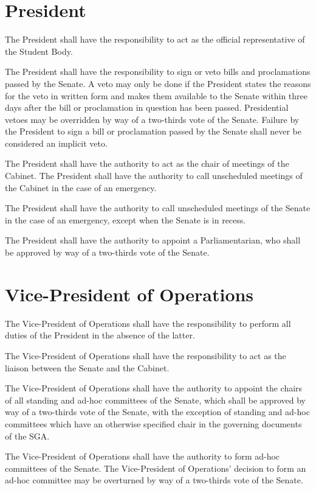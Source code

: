 \documentclass[12pt,oneside]{scrreprt}
\begin{document}
\section{President}
The President shall have the responsibility to act as the official representative of the Student Body.

The President shall have the responsibility to sign or veto bills and proclamations passed by the Senate. A veto may only be done if the President states the reasons for the veto in written form and makes them available to the Senate within three days after the bill or proclamation in question has been passed. Presidential vetoes may be overridden by way of a two-thirds vote of the Senate. Failure by the President to sign a bill or proclamation passed by the Senate shall never be considered an implicit veto.

The President shall have the authority to act as the chair of meetings of the Cabinet. The President shall have the authority to call unscheduled meetings of the Cabinet in the case of an emergency.

The President shall have the authority to call unscheduled meetings of the Senate in the case of an emergency, except when the Senate is in recess.

The President shall have the authority to appoint a Parliamentarian, who shall be approved by way of a two-thirds vote of the Senate.

\section{Vice-President of Operations}
The Vice-President of Operations shall have the responsibility to perform all duties of the President in the absence of the latter.

The Vice-President of Operations shall have the responsibility to act as the liaison between the Senate and the Cabinet.

The Vice-President of Operations shall have the authority to appoint the chairs of all standing and ad-hoc committees of the Senate, which shall be approved by way of a two-thirds vote of the Senate, with the exception of standing and ad-hoc committees which have an otherwise specified chair in the governing documents of the SGA.

The Vice-President of Operations shall have the authority to form ad-hoc committees of the Senate. The Vice-President of Operations' decision to form an ad-hoc committee may be overturned by way of a two-thirds vote of the Senate.
\end{document}
